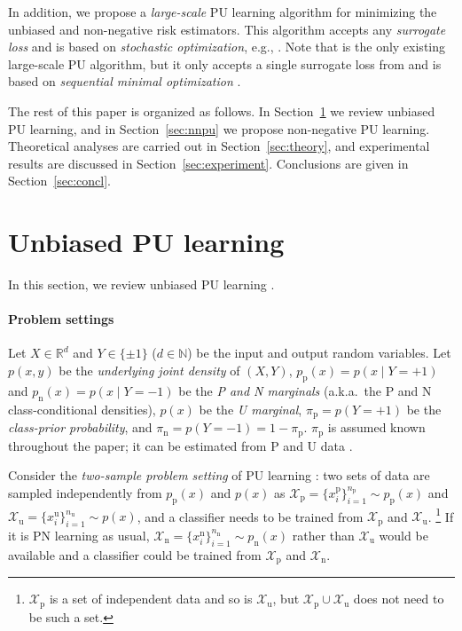 \documentclass{article}
\newcommand{\bR}{\mathbb{R}}
\newcommand{\cX}{\mathcal{X}}
\newcommand{\prp}{p_\mathrm{p}}
\newcommand{\prn}{p_\mathrm{n}}
\newcommand{\pip}{\pi_\mathrm{p}}
\newcommand{\pin}{\pi_\mathrm{n}}
\newcommand{\Xp}{\cX_\mathrm{p}}
\newcommand{\Xn}{\cX_\mathrm{n}}
\newcommand{\Xu}{\cX_\mathrm{u}}
\newcommand{\xp}{x^\mathrm{p}}
\newcommand{\xn}{x^\mathrm{n}}
\newcommand{\xu}{x^\mathrm{u}}
\newcommand{\Np}{{n_\mathrm{p}}}
\newcommand{\Nn}{{n_\mathrm{n}}}
\newcommand{\Nu}{{n_\mathrm{u}}}
\begin{document}
In addition, we propose a \emph{large-scale} PU learning algorithm for minimizing the unbiased and non-negative risk estimators. This algorithm accepts any \emph{surrogate loss} and is based on \emph{stochastic optimization}, e.g., \cite{kingma15iclr}. Note that \cite{sansone16arxiv} is the only existing large-scale PU algorithm, but it only accepts a single surrogate loss from \cite{christo15icml} and is based on \emph{sequential minimal optimization} \citep{platt99SMO}.

The rest of this paper is organized as follows. In Section~\ref{sec:upu} we review unbiased PU learning,  and in Section~\ref{sec:nnpu} we propose non-negative PU learning. Theoretical analyses are carried out in Section~\ref{sec:theory}, and experimental results are discussed in Section~\ref{sec:experiment}. Conclusions are given in Section~\ref{sec:concl}.

\section{Unbiased PU learning}
\label{sec:upu}%

In this section, we review unbiased PU learning \citep{christo14nips,christo15icml}.

\paragraph{Problem settings}
Let $X\in\bR^d$ and $Y\in\{\pm1\}$ ($d\in\mathbb{N}$) be the input and output random variables. Let $p(x,y)$ be the \emph{underlying joint density} of $(X,Y)$, $\prp(x)=p(x\mid Y=+1)$ and $\prn(x)=p(x\mid Y=-1)$ be the \emph{P and N marginals} (a.k.a.\ the P and N class-conditional densities), $p(x)$ be the \emph{U marginal}, $\pip=p(Y=+1)$ be the \emph{class-prior probability}, and $\pin=p(Y=-1)=1-\pip$. $\pip$ is assumed known throughout the paper; it can be estimated from P and U data \citep{menon15icml,ramaswamy16icml,jain16nips,christo17mlj}.

Consider the \emph{two-sample problem setting} of PU learning \citep{ward09biometrics}: two sets of data are sampled independently from $\prp(x)$ and $p(x)$ as $\Xp=\{\xp_i\}_{i=1}^\Np\sim\prp(x)$ and $\Xu=\{\xu_i\}_{i=1}^\Nu\sim p(x)$, and a classifier needs to be trained from $\Xp$ and $\Xu$.%
\footnote{$\Xp$ is a set of independent data and so is $\Xu$, but $\Xp\cup\Xu$ does not need to be such a set.}
If it is PN learning as usual, $\Xn=\{\xn_i\}_{i=1}^\Nn\sim\prn(x)$ rather than $\Xu$ would be available and a classifier could be trained from $\Xp$ and $\Xn$.
\end{document}
